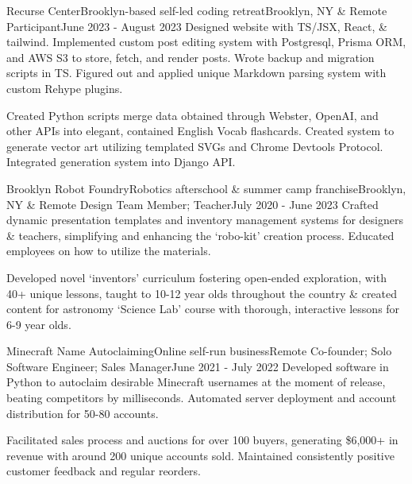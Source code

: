 \documentclass[letterpaper, 10pt]{article}
\begin{document}
	\resumeSubheading
	{Recurse Center}{Brooklyn-based self-led coding retreat}{Brooklyn, NY \& Remote}
	{Participant}{June 2023 - August 2023}{}
	\resumeItemListStart
		{Designed website with TS/JSX, React, \& tailwind. Implemented custom post editing system with Postgresql, Prisma ORM, and AWS S3 to store, fetch, and render posts. Wrote backup and migration scripts in TS. Figured out and applied unique Markdown parsing system with custom Rehype plugins.}
		
		{Created Python scripts merge data obtained through Webster, OpenAI, and other APIs into elegant, contained English Vocab flashcards. Created system to generate vector art utilizing templated SVGs and Chrome Devtools Protocol. Integrated generation system into Django API.}
	\resumeItemListEnd
	
	\resumeSubheading
	{Brooklyn Robot Foundry}{Robotics afterschool \& summer camp franchise}{Brooklyn, NY \& Remote}
	{Design Team Member; Teacher}{July 2020 - June 2023}{}
	\resumeItemListStart
		{Crafted dynamic presentation templates and inventory management systems for designers \& teachers, simplifying and enhancing the `robo-kit' creation process. Educated employees on how to utilize the materials.}
		
		{Developed novel `inventors' curriculum fostering open-ended exploration, with 40+ unique lessons, taught to 10-12 year olds throughout the country \& created content for astronomy `Science Lab' course with thorough, interactive lessons for 6-9 year olds.}
		
	\resumeItemListEnd
	
	\resumeSubheading
	{Minecraft Name Autoclaiming}{Online self-run business}{Remote}
	{Co-founder; Solo Software Engineer; Sales Manager}{June 2021 - July 2022}{}
	\resumeItemListStart
		{Developed software in Python to autoclaim desirable Minecraft usernames at the moment of release, beating competitors by milliseconds. Automated server deployment and account distribution for 50-80 accounts.}
		
		{Facilitated sales process and auctions for over 100 buyers, generating \$6,000+ in revenue with around 200 unique accounts sold. Maintained consistently positive customer feedback and regular reorders.}
		
\end{document}
